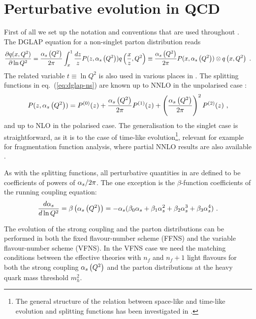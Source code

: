 \section{Perturbative evolution in QCD}
\label{sec:pqcd}
First of all we set up the notation and
conventions that are used throughout \hoppet. The DGLAP
equation for a non-singlet parton distribution reads
\begin{equation}
  \label{eq:dglap-ns}
  \frac{\partial q(x,Q^2)}{\partial \ln Q^2} = 
\frac{\alpha_s\left( Q^2 \right)}{2\pi}\int_x^1 \frac{dz}{z}
  P(z,\alpha_s\left( Q^2 \right)) q\left( \frac{x}{z},Q^2\right) \equiv 
\frac{\alpha_s\left( Q^2 \right)}{2\pi}  P(x,\alpha_s\left( Q^2 \right)) \otimes q\left( x,Q^2\right) \ .
\end{equation}
The related variable $t\equiv \ln Q^2$ is also used
in various places in \hoppet.
The splitting functions in eq.~(\ref{eq:dglap-ns})
are known up to NNLO in the 
unpolarised case \cite{Furmanski:1980cm,Curci:1980uw,NNLO-NS,NNLO-singlet}:
\begin{equation}
  \label{eq:dpdf}
   P(z,\alpha_s\left( Q^2 \right))=P^{(0)}(z)+\frac{\alpha_s\left( Q^2 \right)}{2\pi}P^{(1)}(z)+
\left( \frac{\alpha_s\left( Q^2 \right)}{2\pi} \right)^2 P^{(2)}(z) \ ,
\end{equation}
and up to NLO \cite{Mertig:1995ny,Vogelsang:1996im} in the polarised case.
The generalisation to the singlet case is straightforward, as it
is 
to the case of time-like evolution\footnote{
The general structure of the relation between space-like
and time-like evolution and splitting functions
 has been investigated in \cite{Furmanski:1980cm,Curci:1980uw,Stratmann:1996hn,Dokshitzer:2005bf,Mitov:2006ic,Basso:2006nk,Dokshitzer:2006nm,Beccaria:2007bb}.}, 
relevant for example for fragmentation function analysis,
where partial NNLO results
are also available \cite{Mitov:2006ic}.


As with the splitting functions, all perturbative quantities in
\hoppet are defined to be coefficients of powers of $\alpha_s/2\pi$. The one
exception is the $\beta$-function coefficients of the running
coupling equation:
\begin{equation}
  \label{eq:as-ev}
  \frac{d\alpha_s}{d\ln Q^2} = \beta\left( \alpha_s\left( Q^2 \right)\right) = -\alpha_s (\beta_0\alpha_s +
  \beta_1\alpha_s^2 + 
  \beta_2\alpha_s^3 + 
  \beta_3\alpha_s^4) \ .
\end{equation}

The evolution of the strong coupling and the parton distributions can
be performed in both the fixed flavour-number scheme (FFNS) and the 
variable flavour-number scheme (VFNS). In the VFNS case we 
need the matching conditions between the effective
theories with $n_f$ and $n_{f}+1$ light flavours for both the strong 
coupling $\alpha_s\left( Q^2 \right)$ and the parton distributions at the heavy quark
mass threshold $m_h^2$.

